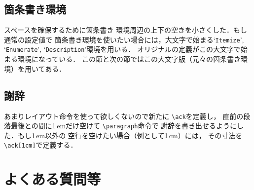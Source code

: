 \documentclass[dvipdfmx,onecolumn]{jsce}  %
\begin{document}
\subsection{箇条書き環境}

スペースを確保するために箇条書き
環境周辺の上下の空きを小さくした．もし通常の設定値で
箇条書き環境を使いたい場合には，大文字で始まる`{\tt Itemize}',
 `{\tt Enumerate}', `{\tt Description}'環境を用いる．
オリジナルの定義がこの大文字で始まる環境になっている．
この節と次の節ではこの大文字版（元々の箇条書き環境）を用いてある．

\subsection{謝辞}

あまりレイアウト命令を使って欲しくないので新たに \verb+\ack+を定義し，
直前の段落最後との間に1\,emだけ空けて \verb+\paragraph+命令で
謝辞を書き出せるようにした．もし1\,em以外の
空行を空けたい場合（例として1\,cm）には，
その寸法を \verb+\ack[1cm]+で定義する．


\section{よくある質問等}
\label{sec:qanda}
\end{document}
